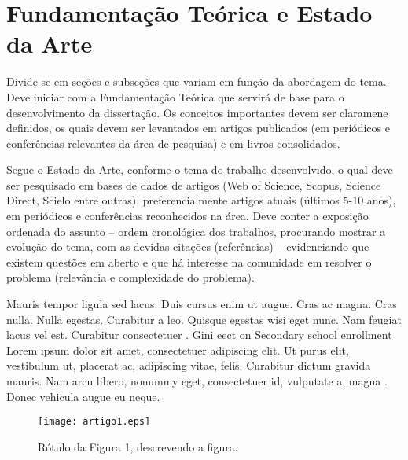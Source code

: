 %
%

\chapter{Fundamentação Teórica e Estado da Arte}
\textcolor{RedOrange}{Divide-se em seções e subseções que variam em função da abordagem do tema. Deve iniciar com a Fundamentação Teórica que servirá de base para o desenvolvimento da dissertação. Os conceitos importantes devem ser claramene definidos, os quais devem ser levantados em artigos publicados (em periódicos e conferências relevantes da área de pesquisa) e em livros consolidados.}

\textcolor{RedOrange}{Segue o Estado da Arte, conforme o tema do trabalho desenvolvido, o qual deve ser pesquisado em bases de dados de artigos (Web of Science, Scopus, Science Direct, Scielo entre outras), preferencialmente artigos atuais (últimos 5-10 anos), em periódicos e conferências reconhecidos na área. Deve conter a exposição ordenada do assunto -- ordem cronológica dos trabalhos, procurando mostrar a evolução do tema, com as devidas citações (referências) -- evidenciando que existem questões em aberto e que há interesse na comunidade em resolver o problema (relevância e complexidade do problema).}

Mauris tempor ligula sed lacus. Duis cursus enim ut augue. Cras ac magna. Cras nulla. Nulla egestas. Curabitur a leo. Quisque egestas wisi eget nunc. Nam feugiat lacus vel est. Curabitur consectetuer \citep{Araujo2015}. Gini eect on Secondary school enrollment Lorem ipsum dolor sit amet, consectetuer adipiscing elit. Ut purus elit, vestibulum ut, placerat ac, adipiscing vitae, felis. Curabitur dictum gravida mauris. Nam arcu libero, nonummy eget, consectetuer id, vulputate a, magna \citep{Folha2015}. Donec vehicula augue eu neque.



\begin{figure}[!h]
	\centering
	\texttt{[image: artigo1.eps]}
	\caption{R\'{o}tulo da Figura 1, descrevendo a figura.}
	\label{fig:artigo1}
\end{figure}

